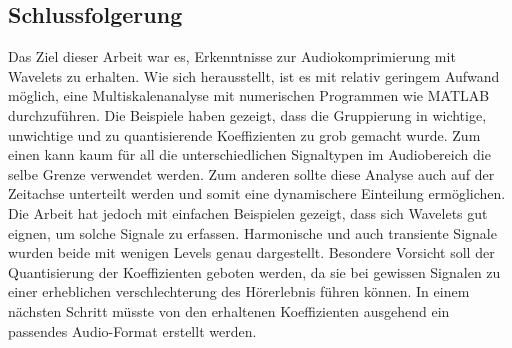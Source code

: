 \begin{refsection}
\section{Schlussfolgerung}
Das Ziel dieser Arbeit war es, Erkenntnisse zur Audiokomprimierung mit Wavelets zu erhalten.
Wie sich herausstellt, ist es mit relativ geringem Aufwand möglich, eine Multiskalenanalyse mit numerischen Programmen wie MATLAB durchzuführen.
Die Beispiele haben gezeigt, dass die Gruppierung in wichtige, unwichtige und zu quantisierende Koeffizienten zu grob gemacht wurde. 
Zum einen kann kaum für all die unterschiedlichen Signaltypen im Audiobereich die selbe Grenze verwendet werden. 
Zum anderen sollte diese Analyse auch auf der Zeitachse unterteilt werden und somit eine dynamischere Einteilung ermöglichen. 
Die Arbeit hat jedoch mit einfachen Beispielen gezeigt, dass sich Wavelets gut eignen, um solche Signale zu erfassen.
Harmonische und auch transiente Signale wurden beide mit wenigen Levels genau dargestellt.
Besondere Vorsicht soll der Quantisierung der Koeffizienten geboten werden, da sie bei gewissen Signalen zu einer erheblichen verschlechterung des Hörerlebnis führen können.
In einem nächsten Schritt müsste von den erhaltenen Koeffizienten ausgehend ein passendes Audio-Format erstellt werden.

\printbibliography[heading=subbibliography]
\end{refsection}
